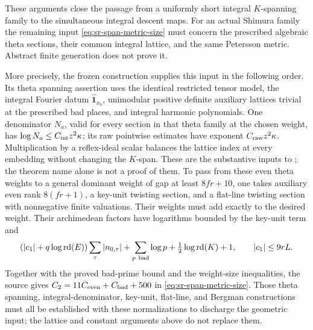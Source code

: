 These arguments close the passage from a uniformly short integral
\(K\)-spanning family to the simultaneous integral descent maps.
For an actual Shimura family the remaining input
\eqref{eq:sr-span-metric-size} must concern the prescribed algebraic
theta sections, their common integral lattice, and the same
Petersson metric.  Abstract finite generation does not prove it.

More precisely, the frozen construction supplies this input in the
following order.  Its theta spanning assertion uses the identical
restricted tensor model, the integral Fourier datum
\(\widehat{\mathbf1}_{x_0}\), unimodular positive definite auxiliary
lattices trivial at the prescribed bad places, and integral harmonic
polynomials.  One denominator \(N_a\), valid for every section in that
theta family at the chosen weight, has
\(\log N_a\le C_{\rm int}z^2\kappa\); its raw pointwise estimates have
exponent \(C_{\rm raw}z^2\kappa\).  Multiplication by a reflex-ideal
scalar balances the lattice index at every embedding without changing
the \(K\)-span.  These are the substantive inputs to
; the theorem name alone is not
a proof of them.
To pass from these even theta weights to a general dominant weight of
gap at least \(8fr+10\), one takes auxiliary even rank
\(8(fr+1)\), a key-unit twisting section, and a flat-line twisting
section with nonnegative finite valuations.  Their weights must add
exactly to the desired weight.  Their archimedean factors have
logarithms bounded by the key-unit term and
\[
 (|c_1|+q\log\operatorname{rd}(E))\sum_\tau|n_{0,\tau}|
 +\sum_{p\ {\rm bad}}\log p
 +\tfrac12\log\operatorname{rd}(K)+1,
 \qquad |c_1|\le9rL.
\]
Together with the proved bad-prime bound and the weight-size
inequalities, the source gives
\(C_2=11C_{\rm even}+C_{\rm bad}+500\) in
\eqref{eq:sr-span-metric-size}.
Those theta spanning, integral-denominator, key-unit, flat-line, and
Bergman constructions must all be established with these
normalizations to discharge the geometric input; the lattice and
constant arguments above do not replace them.
